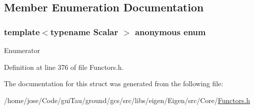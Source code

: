 \subsection{Member Enumeration Documentation}
\hypertarget{structei__functor__allows__mixing__real__and__complex_3_01ei__scalar__product__op_3_01_scalar_01_4_01_4_a2b9505be01d32558491881090df617b4}{\subsubsection[{anonymous enum}]{\setlength{\rightskip}{0pt plus 5cm}template$<$typename Scalar $>$ anonymous enum}}\label{structei__functor__allows__mixing__real__and__complex_3_01ei__scalar__product__op_3_01_scalar_01_4_01_4_a2b9505be01d32558491881090df617b4}
\begin{Desc}
\item[Enumerator]\par
\begin{description}
\item[{\em 
\hypertarget{structei__functor__allows__mixing__real__and__complex_3_01ei__scalar__product__op_3_01_scalar_01_4_01_4_a2b9505be01d32558491881090df617b4a43c3b5d5c589b5fdc0d5c5e59451062b}{ret}\label{structei__functor__allows__mixing__real__and__complex_3_01ei__scalar__product__op_3_01_scalar_01_4_01_4_a2b9505be01d32558491881090df617b4a43c3b5d5c589b5fdc0d5c5e59451062b}
}]\end{description}
\end{Desc}


Definition at line 376 of file Functors.\-h.



The documentation for this struct was generated from the following file\-:\begin{DoxyCompactItemize}
\item 
/home/jose/\-Code/gui\-Tau/ground/gcs/src/libs/eigen/\-Eigen/src/\-Core/\hyperlink{_core_2_functors_8h}{Functors.\-h}\end{DoxyCompactItemize}
